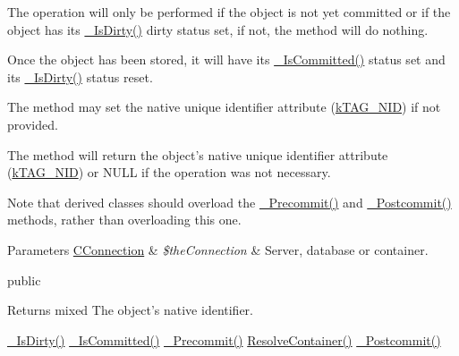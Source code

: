 The operation will only be performed if the object is not yet committed or if the object has its \hyperlink{class_c_status_document_ad5193995e1bff6de09acf3248a232ef9}{\-\_\-\-Is\-Dirty()} dirty status set, if not, the method will do nothing.

Once the object has been stored, it will have its \hyperlink{class_c_status_document_ab7d96fd4588cf7d5432fc65a1d1fb076}{\-\_\-\-Is\-Committed()} status set and its \hyperlink{class_c_status_document_ad5193995e1bff6de09acf3248a232ef9}{\-\_\-\-Is\-Dirty()} status reset.

The method may set the native unique identifier attribute (\hyperlink{}{k\-T\-A\-G\-\_\-\-N\-I\-D}) if not provided.

The method will return the object's native unique identifier attribute (\hyperlink{}{k\-T\-A\-G\-\_\-\-N\-I\-D}) or {\ttfamily N\-U\-L\-L} if the operation was not necessary.

Note that derived classes should overload the \hyperlink{class_c_persistent_document_a23cfbb5ebf75e008622ab9e723472c70}{\-\_\-\-Precommit()} and \hyperlink{class_c_persistent_document_aa7fdfe47ee3099ebda49a76e1fa24670}{\-\_\-\-Postcommit()} methods, rather than overloading this one.


\begin{DoxyParams}[1]{Parameters}
\hyperlink{class_c_connection}{C\-Connection} & {\em \$the\-Connection} & Server, database or container.\\
\hline
\end{DoxyParams}
public \begin{DoxyReturn}{Returns}
mixed The object's native identifier.
\end{DoxyReturn}
\hyperlink{class_c_status_document_ad5193995e1bff6de09acf3248a232ef9}{\-\_\-\-Is\-Dirty()}  \hyperlink{class_c_status_document_ab7d96fd4588cf7d5432fc65a1d1fb076}{\-\_\-\-Is\-Committed()}  \hyperlink{class_c_persistent_document_a23cfbb5ebf75e008622ab9e723472c70}{\-\_\-\-Precommit()}  \hyperlink{class_c_persistent_document_a4dbe287aa3b46bdc0a1157e001078589}{Resolve\-Container()}  \hyperlink{class_c_persistent_document_aa7fdfe47ee3099ebda49a76e1fa24670}{\-\_\-\-Postcommit()}

